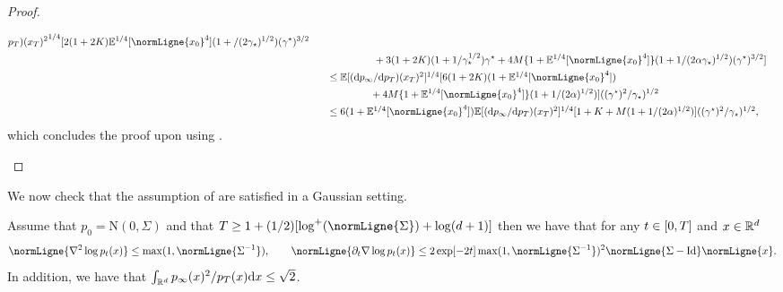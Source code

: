 \begin{proof}
\begin{enumerate}[wide, labelwidth=!, labelindent=0pt, label=(\alph*)]
\begin{align}
{{                                                                        p_T)(x_T)^2}^{1/4}} [2(1 + 2 \Ktt)\expeLignesqrtt{\normLigne{x_0}^4}(1 +/(2\gamma_\star)^{1/2})(\gamma^\star)^{3/2}  \\
        &\qquad \qquad \qquad \  + 3 (1 + 2 \Ktt) (1 +1/\gamma_\star^{1/2})\gamma^\star + 4 \Mtt \{1 + \expeLignesqrtt{\normLigne{x_0}^4}\} (1 +1/(2 \alpha\gamma_\star)^{1/2})  (\gamma^\star)^{3/2}] \\
  &\qquad \textstyle{\leq  \expeLigne{(\rmd p_\infty / \rmd
    p_T)(x_T)^2}^{1/4}} [6(1 + 2 \Ktt)(1+\expeLignesqrtt{\normLigne{x_0}^4}) \\
  & \qquad \qquad \qquad + 4 \Mtt \{1 + \expeLignesqrtt{\normLigne{x_0}^4}\} (1 +1/(2 \alpha)^{1/2}) ]((\gamma^\star)^{2}/\gamma_\star)^{1/2} \\
  &\qquad \textstyle{\leq  6 (1+\expeLignesqrtt{\normLigne{x_0}^4}) \expeLigne{(\rmd p_\infty / \rmd
                                                                        p_T)(x_T)^2}^{1/4}} [1 +  \Ktt + \Mtt (1 +1/(2 \alpha)^{1/2}) ]((\gamma^\star)^{2}/\gamma_\star)^{1/2}  ,
\end{align}
which concludes the proof upon using .
    \end{enumerate}    
  \end{proof}

  We now check that the assumption of  are satisfied in a Gaussian setting.

\begin{proposition}
  \label{prop:gaussian_case}
  Assume that $p_0 = \mathrm{N}(0, \Sigma)$ and that
  $T \geq 1 +(1/2)[\log^+(\normLigne{\Sigma}) + \log(d+1)]$ then we have that
  for any $t \in \left[0,T\right]$ and $x \in \mathbb{R}^d$
  \begin{equation}
    \normLigne{\nabla^2 \log p_t(x)} \leq \max(1, \normLigne{\Sigma^{-1}})  , \qquad \normLigne{\partial_t \nabla \log p_t(x)} \leq 2 \exp[-2 t] \max(1, \normLigne{\Sigma^{-1}})^2 \normLigne{\Sigma - \Id}\normLigne{x}  . 
  \end{equation}
  In addition, we have that $\int_{\mathbb{R}^d} p_\infty(x)^2/p_T(x) \mathrm{d} x \leq \sqrt{2}$.
\end{proposition}

